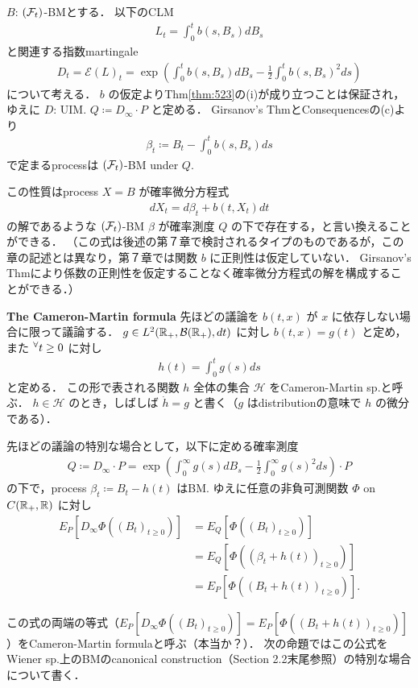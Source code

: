 \documentclass{jsarticle}
\begin{document}
$B$: $(\mathcal{F}_t)$-BMとする．
以下のCLM
\begin{align}
    L_t=\int_0^t b(s,B_s)dB_s
\end{align}
と関連する指数martingale
\begin{align}
    D_t
    = \mathcal{E}(L)_t
    = \exp(\int_0^t b(s,B_s)dB_s-\frac{1}{2}\int_0^t b(s,B_s)^2 ds)
\end{align}
について考える．
$b$ の仮定よりThm\ref{thm:523}の(i)が成り立つことは保証され，ゆえに $D$: UIM.
$Q\coloneqq D_\infty\cdot P$ と定める．
Girsanov's ThmとConsequencesの(c)より
\begin{align}
    \beta_t\coloneqq B_t-\int_0^t b(s,B_s)ds
\end{align}
で定まるprocessは $(\mathcal{F}_t)$-BM under $Q.$

この性質はprocess $X=B$ が確率微分方程式
\begin{align}
    dX_t=d\beta_t+b(t,X_t)dt
\end{align}
の解であるような $(\mathcal{F}_t)$-BM $\beta$ が確率測度 $Q$ の下で存在する，と言い換えることができる．
（この式は後述の第７章で検討されるタイプのものであるが，この章の記述とは異なり，第７章では関数 $b$ に正則性は仮定していない．
Girsanov's Thmにより係数の正則性を仮定することなく確率微分方程式の解を構成することができる．）

\textbf{The Cameron-Martin formula}
先ほどの議論を $b(t,x)$ が $x$ に依存しない場合に限って議論する．
$g\in L^2(\mathbb{R}_+,\mathcal{B}(\mathbb{R}_+),dt)$ に対し $b(t,x)=g(t)$ と定め，また ${}^{\forall} t\ge0$ に対し
\begin{align}
    h(t)=\int_{0}^{t}g(s)ds
\end{align}
と定める．
この形で表される関数 $h$ 全体の集合 $\mathcal{H}$ をCameron-Martin sp.と呼ぶ．
$h\in\mathcal{H}$ のとき，しばしば $\dot{h}=g$ と書く（$g$ はdistributionの意味で $h$ の微分である）．

先ほどの議論の特別な場合として，以下に定める確率測度
\begin{align}
    Q
    \coloneqq D_\infty\cdot P
    = \exp(\int_0^\infty g(s)dB_s-\frac{1}{2}\int_0^\infty g(s)^2 ds)\cdot P
\end{align}
の下で，process $\beta_t\coloneqq B_t-h(t)$ はBM.
ゆえに任意の非負可測関数 $\Phi$ on $C(\mathbb{R}_+,\mathbb{R})$ に対し
\begin{align}
    E_P[D_\infty\Phi((B_t)_{t\ge0})]
    &= E_Q[\Phi((B_t)_{t\ge0})] \\
    &= E_Q[\Phi((\beta_t+h(t))_{t\ge0})] \\
    &= E_P[\Phi((B_t+h(t))_{t\ge0})].
\end{align}

この式の両端の等式（$E_P[D_\infty\Phi((B_t)_{t\ge0})]=E_P[\Phi((B_t+h(t))_{t\ge0})]$）をCameron-Martin formulaと呼ぶ（本当か？）．
次の命題ではこの公式をWiener sp.上のBMのcanonical construction（Section 2.2末尾参照）の特別な場合について書く．
\end{document}
